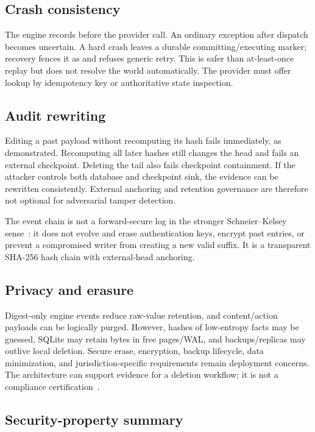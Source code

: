 \subsection{Crash consistency}

The engine records  before the provider call. An ordinary exception after dispatch becomes uncertain. A hard crash leaves a durable committing/executing marker; recovery fences it as  and refuses generic retry. This is safer than at-least-once replay but does not resolve the world automatically. The provider must offer lookup by idempotency key or authoritative state inspection.

\subsection{Audit rewriting}

Editing a past payload without recomputing its hash fails immediately, as demonstrated. Recomputing all later hashes still changes the head and fails an external checkpoint. Deleting the tail also fails checkpoint containment. If the attacker controls both database and checkpoint sink, the evidence can be rewritten consistently. External anchoring and retention governance are therefore not optional for adversarial tamper detection.

The event chain is not a forward-secure log in the stronger Schneier--Kelsey sense~\cite{schneier1998securelogs}: it does not evolve and erase authentication keys, encrypt past entries, or prevent a compromised writer from creating a new valid suffix. It is a transparent SHA-256 hash chain with external-head anchoring.

\subsection{Privacy and erasure}

Digest-only engine events reduce raw-value retention, and content/action payloads can be logically purged. However, hashes of low-entropy facts may be guessed, SQLite may retain bytes in free pages/WAL, and backups/replicas may outlive local deletion. Secure erase, encryption, backup lifecycle, data minimization, and jurisdiction-specific requirements remain deployment concerns. The architecture can support evidence for a deletion workflow; it is not a compliance certification~\cite{nist2023airmf}.

\subsection{Security-property summary}

